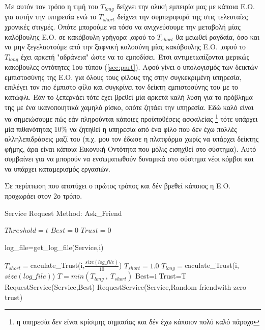 Με αυτόν τον τρόπο η τιμή του  $T_{long}$ δείχνει την ολική εμπειρία μας με κάποια Ε.Ο. για αυτήν την υπηρεσία ενώ το $T_{short}$ δείχνει την συμπεριφορά της στις τελευταίες χρονικές στιγμές. Οπότε μπορούμε να τόσο να ανιχνεύσουμε την μεταβολή μίας καλόβουλης Ε.Ο. σε κακόβουλη γρήγορα ,αφού το $T_{short}$ θα μειωθεί ραγδαία, όσο και να μην ξεγελαστούμε από την ξαφνική καλοσύνη μίας κακόβουλης Ε.Ο. ,αφού το $T_{long}$  έχει αρκετή "αδράνεια" ώστε να το εμποδίσει. Έτσι αντιμετωπίζονται μερικώς κακόβουλες οντότητες 1ου τύπου (\ref{sec:part}).
\newpage
Αφού γίνει ο υπολογισμός των δεικτών εμπιστοσύνης της Ε.Ο. για όλους τους φίλους της στην συγκεκριμένη υπηρεσία, επιλέγει τον πιο έμπιστο φίλο και συγκρίνει τον δείκτη εμπιστοσύνης του με το κατώφλι. Εάν το ξεπερνάει τότε έχει βρεθεί μία αρκετά καλή λύση για το πρόβλημα της με ένα ικανοποιητικά χαμηλό ρίσκο, οπότε ζητάει την υπηρεσία. Εδώ καλό είναι να σημειώσουμε πώς εάν πληρούνται κάποιες προϋποθέσεις ασφαλείας \footnote{η υπηρεσία δεν είναι κρίσιμης σημασίας και δέν έχω κάποιον πολύ καλό πάροχο} τότε υπάρχει μία πιθανότητας 10\% να ζητηθεί η υπηρεσία από ένα φίλο που δεν έχω πολλές αλληλεπιδράσεις μαζί του (π.χ. μου τον έδωσε η πλατφόρμα χωρίς να υπάρχει δείκτης φήμης, άρα είναι κάποια Εικονική Οντότητα που μόλις εισηχθεί στο σύστημα). Αυτό συμβαίνει για να μπορούν να ενσωματωθούν δυναμικά στο σύστημα νέοι κόμβοι και να υπάρχει καταμερισμός εργασιών. 

Σε περίπτωση που αποτύχει ο πρώτος τρόπος και δέν βρεθεί κάποιος η Ε.Ο. προχωράει στον 2ο τρόπο. 

\begin{algorithm}
\caption{Service Request Method: Ask\_Friend}
\label{Service Request 1}
\begin{algorithmic}[1]
\State $Threshold = t$
\State $Best = 0$
\State $Trust = 0$


\State log\_file=get\_log\_file(Service,i)

\State $T_{short}=$caculate\_Trust(i,$\frac{size \left(log\_file\right)}{10}$)
   \Else \State $T_{short}=1.0$
   \EndIf
\State $T_{long}=$caculate\_Trust(i,$size \left(log\_file\right)$)
\State $ T = min(T_{long} \  , \  T_{short})$
	\State Best=i
	\State Trust=T
\EndIf
\EndFor
{}
	\State RequestService(Service,Best)
	\Else 
			\State RequestService(Service,Random friendwith zero trust)
	\EndIf
\EndIf

\EndProcedure
\end{algorithmic}
\end{algorithm}
\newpage
